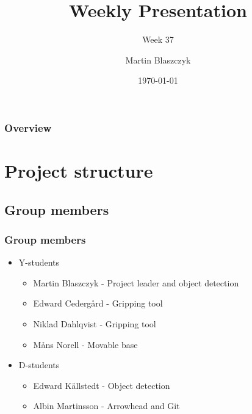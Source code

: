 \documentclass{beamer}
\title{Weekly Presentation}
\subtitle{Week 37}
\author{Martin Blaszczyk}
\institute{Luleå University of Technology}
\date{\today}
\begin{document}
\begin{frame}
    \titlepage
\end{frame}

\begin{frame}
    \frametitle{Overview}
    \tableofcontents
\end{frame}

\section{Project structure}
\begin{frame}
    \subsection{Group members}
    \frametitle{Group members }
    \begin{itemize}
        \item Y-students
        \begin{itemize}
            \item Martin Blaszczyk - Project leader and object detection
            \item Edward Cedergård - Gripping tool
            \item Niklad Dahlqvist - Gripping tool
            \item Måns Norell - Movable base
        \end{itemize}
        \item D-students
        \begin{itemize}
            \item Edward Källstedt - Object detection
            \item Albin Martinsson - Arrowhead and Git
        \end{itemize}  
    \end{itemize}
\end{frame}
\end{document}
